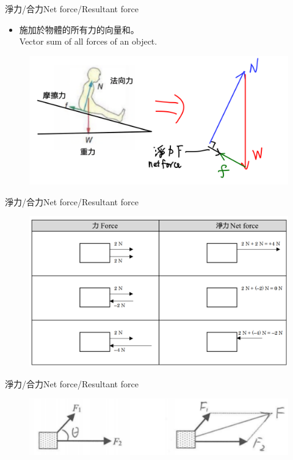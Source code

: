 \documentclass[beamer=true]{standalone}
\begin{document}
\begin{frame}{淨力/合力Net force/Resultant force}
    \begin{itemize}
        \item 施加於物體的所有力的向量和。\\Vector sum of all forces of an object.
    \end{itemize}\bigskip
    \begin{figure}[h!]
        \centering
        \includegraphics[width=.8\textwidth]{assets/96369bc9.png}
    \end{figure}
\end{frame}
\begin{frame}{淨力/合力Net force/Resultant force}
    \begin{figure}[h!]
        \centering
        \includegraphics[width=\textwidth]{assets/5ffd7887.png}
    \end{figure}
\end{frame}
\begin{frame}{淨力/合力Net force/Resultant force}
    \begin{figure}[h!]
        \centering
        \includegraphics[width=.8\textwidth]{assets/61448695.png}
    \end{figure}
\end{frame}
\end{document}
